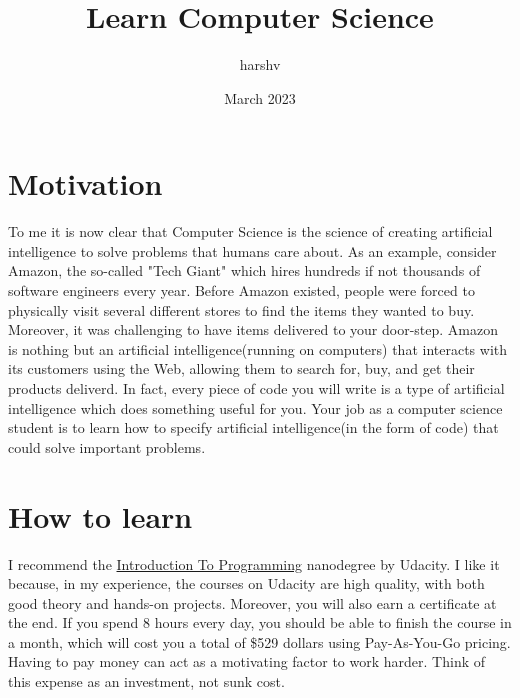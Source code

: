 \documentclass{article}
\title{Learn Computer Science}
\author{harshv}
\date{March 2023}
\begin{document}
\maketitle

\section*{Motivation}
To me it is now clear that Computer Science is the science of creating artificial
intelligence to solve problems that humans care about. As an example,
consider Amazon, the so-called "Tech Giant" which hires hundreds if not thousands 
of software engineers every year. Before Amazon existed, people were forced to
physically visit several different stores to find the items they wanted to buy.
Moreover, it was challenging to have items delivered to your door-step. 
Amazon is nothing but an artificial intelligence(running on computers) that
interacts with its customers using the Web, allowing them to search for, buy,
and get their products deliverd. In fact, every piece of code you will write
is a type of artificial intelligence which does something useful for you.
Your job as a computer science student is to learn how to specify 
artificial intelligence(in the form of code) that could solve important problems.

\section*{How to learn}
I recommend the \href{https://www.udacity.com/course/intro-to-programming-nanodegree--nd000}{Introduction To Programming} 
nanodegree by Udacity. I like it because, in my experience, the courses on Udacity are high quality,
with both good theory and hands-on projects. Moreover, you will also 
earn a certificate at the end. If you spend 8 hours every day, you should be able to finish
the course in a month, which will cost you a total of \$529 dollars using Pay-As-You-Go pricing.
Having to pay money can act as a motivating factor to work harder. Think of this expense
as an investment, not sunk cost.
\end{document}
